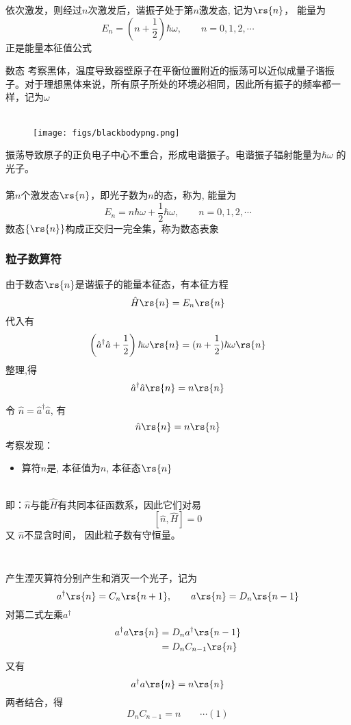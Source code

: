 \begin{frame}
依次激发，则经过$n$次激发后，谐振子处于第$n$激发态, 记为$ \rs{n} $， 能量为
\[\boxed{E_n = (n+\frac{1}{2})\hbar \omega, \qquad n=0,1,2, \cdots}  \]
正是能量本征值公式
\end{frame} 


\begin{frame}{数态}
考察黑体，温度导致器壁原子在平衡位置附近的振荡可以近似成量子谐振子。对于理想黑体来说，所有原子所处的环境必相同，因此所有振子的频率都一样，记为$\omega$\\
~~\\  
\begin{wrapfigure} {r} {0.25\textwidth} %
        \texttt{[image: figs/blackbodypng.png]}   
    \end{wrapfigure}
振荡导致原子的正负电子中心不重合，形成电谐振子。电谐振子辐射能量为$\hbar \omega$ 的光子。\\
~~\\ 
第$n$个激发态$\rs{n}$，即光子数为$n$的态，称为\emf[数态], 能量为
\[E_n = n\hbar \omega+\frac{1}{2}\hbar \omega, \qquad n=0,1,2, \cdots  \]
数态$\{ \rs{n} \}$构成正交归一完全集，称为数态表象
\end{frame}


\begin{frame}
    \frametitle{粒子数算符}
由于数态$\rs{n}$是谐振子的能量本征态，有本征方程
\[  \hat{H}\rs{n} = E_n \rs{n}\]
代入有
\[\left(\hat{a}^\dagger \hat{a} + \frac{1 }{2}\right) \hbar \omega \rs{n} = (n+\frac{1}{2})\hbar \omega \rs{n} \]
整理,得
\[\hat{a}^\dagger \hat{a} \rs{n} = n \rs{n} \]
\end{frame}

\begin{frame}
    令 $ \hat{n}  = \hat{a}^\dagger \hat{a}  $, 有
\[\hat{n} \rs{n} = n \rs{n} \]
考察发现：
\begin{itemize}
  \item 算符$\hat{n}$是\emf[粒子数算符] , 本征值为$n$, 本征态$\rs{n}$
\end{itemize}
~~\\
即：$\hat{n}$与能$\hat{H}$有共同本征函数系，因此它们对易
\[ [\hat{n}, \hat{H}] =0\]
又 $\hat{n}$不显含时间， 因此粒子数有守恒量。
\end{frame}

\begin{frame}
    \frametitle{}
    ~~\\ 
\证 产生湮灭算符分别产生和消灭一个光子，记为 
    \[ a^\dagger \rs{n}= C_n \rs{n+1}, \qquad a \rs{n}= D_n\rs{n-1} \] 
对第二式左乘$a^\dagger$
    \[ 
      \begin{aligned}
        a^\dagger a \rs{n} &=  D_n a^\dagger\rs{n-1} \\ 
        &= D_n C_{n-1} \rs{n}       
      \end{aligned}
      \] 
又有 
\[ a^\dagger a \rs{n} = n \rs{n}  \]
两者结合，得
$$
D_n C_{n-1}=n \qquad \cdots (1) 
$$ 
\end{frame}

